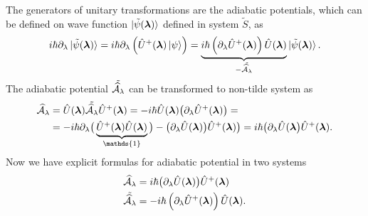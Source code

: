 




The generators of unitary transformations are the adiabatic potentials, which can be defined on wave function $\ket{\tilde\psi(\llambda)}$ defined in system $\tilde S$, as
\begin{equation}
    i\hbar\partial_\lambda \ket{\tilde{\psi}(\llambda)} = i\hbar \partial_\lambda\left(\U^+(\llambda)\ket{\psi} \right)= \underbrace{i\hbar\left(\partial_\lambda \U^+(\llambda)\right)\U(\llambda)}_{-\tilde{\AA_\lambda}}\ket{\tilde{\psi}(\llambda)}.
\end{equation}
The adiabatic potential $\tilde{\AA_\lambda}$ can be transformed to non-tilde system as
\begin{equation}
    \begin{split}
        \AA_\lambda&=\U(\llambda)\tilde{\AA_\lambda}\U^+(\llambda) = -i\hbar\U(\llambda)\big(\partial_\lambda \U^+(\llambda)\big) =\\
        &= -i\hbar\partial_\lambda\big(\underbrace{\U^+(\llambda)\U(\llambda)}_{\mathds{1}}\big)-\big(\partial_\lambda \U(\llambda)\big)\U^+(\llambda) \big) =i\hbar \big(\partial_\lambda \U(\llambda\big)\U^+(\llambda).
    \end{split}
\end{equation}
Now we have explicit formulas for adiabatic potential in two systems
\begin{align}
    \AA_\lambda&=i\hbar \big(\partial_\lambda \U(\llambda)\big)\U^+(\llambda)
    \label{eq:adiabaticPotential}\\
    \tilde{\AA_\lambda} &= -i\hbar\left(\partial_\lambda \U^+(\llambda)\right)\U(\llambda).
    \label{eq:adiabaticPotentialTilde}
\end{align}

